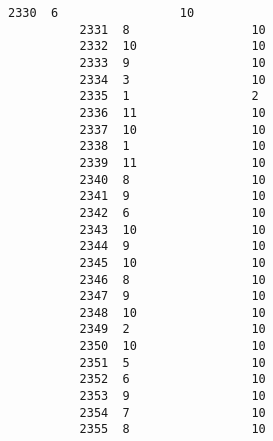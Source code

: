 \documentclass[11pt]{article}
\begin{document}
\begin{Verbatim}[commandchars=\\\{\}]
          2330  6                 10                   
          2331  8                 10                   
          2332  10                10                   
          2333  9                 10                   
          2334  3                 10                   
          2335  1                 2                    
          2336  11                10                   
          2337  10                10                   
          2338  1                 10                   
          2339  11                10                   
          2340  8                 10                   
          2341  9                 10                   
          2342  6                 10                   
          2343  10                10                   
          2344  9                 10                   
          2345  10                10                   
          2346  8                 10                   
          2347  9                 10                   
          2348  10                10                   
          2349  2                 10                   
          2350  10                10                   
          2351  5                 10                   
          2352  6                 10                   
          2353  9                 10                   
          2354  7                 10                   
          2355  8                 10                   
          

\end{Verbatim}
\end{document}
